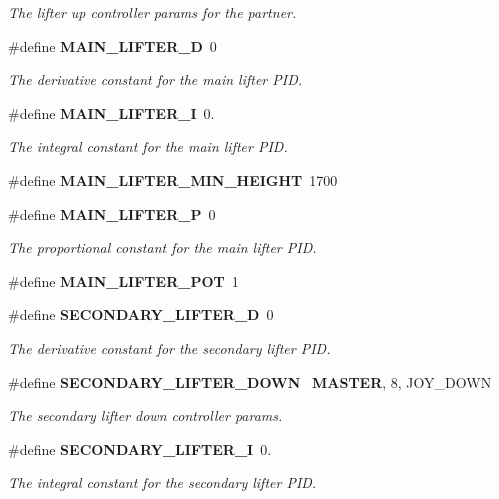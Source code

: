 \begin{DoxyCompactItemize}
\begin{DoxyCompactList}\small\item\em The lifter up controller params for the partner. \end{DoxyCompactList}\item 
\#define \textbf{ M\+A\+I\+N\+\_\+\+L\+I\+F\+T\+E\+R\+\_\+D}~0
\begin{DoxyCompactList}\small\item\em The derivative constant for the main lifter P\+ID. \end{DoxyCompactList}\item 
\#define \textbf{ M\+A\+I\+N\+\_\+\+L\+I\+F\+T\+E\+R\+\_\+I}~0.
\begin{DoxyCompactList}\small\item\em The integral constant for the main lifter P\+ID. \end{DoxyCompactList}\item 
\#define \textbf{ M\+A\+I\+N\+\_\+\+L\+I\+F\+T\+E\+R\+\_\+\+M\+I\+N\+\_\+\+H\+E\+I\+G\+HT}~1700
\item 
\#define \textbf{ M\+A\+I\+N\+\_\+\+L\+I\+F\+T\+E\+R\+\_\+P}~0
\begin{DoxyCompactList}\small\item\em The proportional constant for the main lifter P\+ID. \end{DoxyCompactList}\item 
\#define \textbf{ M\+A\+I\+N\+\_\+\+L\+I\+F\+T\+E\+R\+\_\+\+P\+OT}~1
\item 
\#define \textbf{ S\+E\+C\+O\+N\+D\+A\+R\+Y\+\_\+\+L\+I\+F\+T\+E\+R\+\_\+D}~0
\begin{DoxyCompactList}\small\item\em The derivative constant for the secondary lifter P\+ID. \end{DoxyCompactList}\item 
\#define \textbf{ S\+E\+C\+O\+N\+D\+A\+R\+Y\+\_\+\+L\+I\+F\+T\+E\+R\+\_\+\+D\+O\+WN}~\textbf{ M\+A\+S\+T\+ER}, 8, J\+O\+Y\+\_\+\+D\+O\+WN
\begin{DoxyCompactList}\small\item\em The secondary lifter down controller params. \end{DoxyCompactList}\item 
\#define \textbf{ S\+E\+C\+O\+N\+D\+A\+R\+Y\+\_\+\+L\+I\+F\+T\+E\+R\+\_\+I}~0.
\begin{DoxyCompactList}\small\item\em The integral constant for the secondary lifter P\+ID. \end{DoxyCompactList}\item 

\end{DoxyCompactItemize}
